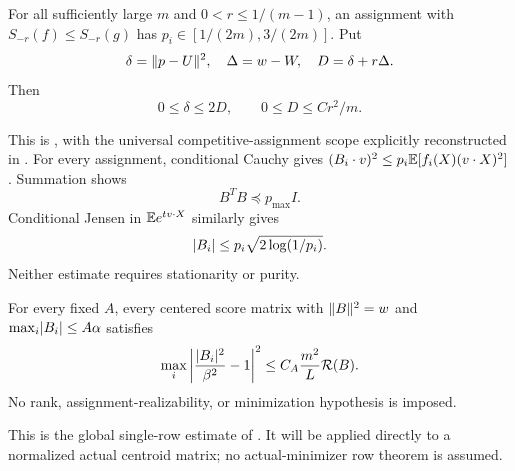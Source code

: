 \begin{prior}
\label{prior:localization}
For all sufficiently large $m$ and $0<r\le1/(m-1)$, an assignment with
$S_{-r}(f)\le S_{-r}(g)$ has $p_i\in[1/(2m),3/(2m)]$. Put
\[
 \delta=\lVert p-U\rVert^2,\quad \Delta=w-W,\quad D=\delta+r\Delta.
\]
Then
\begin{equation}\label{eq:localization}
              0\le\delta\le2D,\qquad 0\le D\le Cr^2/m.
\end{equation}
\end{prior}
This is \cite{localization}, with the universal competitive-assignment
scope explicitly reconstructed in \cite{direct}. For every assignment,
conditional Cauchy gives
$(B_i\cdot v)^2\le p_i\mathbb E[f_i(X)(v\cdot X)^2]$. Summation shows
\begin{equation}\label{eq:actual-operator}
                              B^TB\preceq p_{\max}I.
\end{equation}
Conditional Jensen in $\mathbb E e^{t v\cdot X}$ similarly gives
\begin{equation}\label{eq:entropy-centroid}
                 \lvert B_i\rvert\le p_i\sqrt{2\log(1/p_i)}.
\end{equation}
Neither estimate requires stationarity or purity.

\begin{prior}\label{prior:one-row}
For every fixed $A$, every centered score matrix with
$\lVert B\rVert^2=w$ and $\max_i\lvert B_i\rvert\le A\alpha$ satisfies
\begin{equation}\label{eq:one-row}
 \max_i\left|\frac{\lvert B_i\rvert^2}{\beta^2}-1\right|^2
                         \le C_A\frac{m^2}{L}\mathcal R(B).
\end{equation}
No rank, assignment-realizability, or minimization hypothesis is imposed.
\end{prior}
This is the global single-row estimate of \cite[Theorem~1]{rowcontrol}.
It will be applied directly to a normalized actual centroid matrix;
no actual-minimizer row theorem is assumed.

